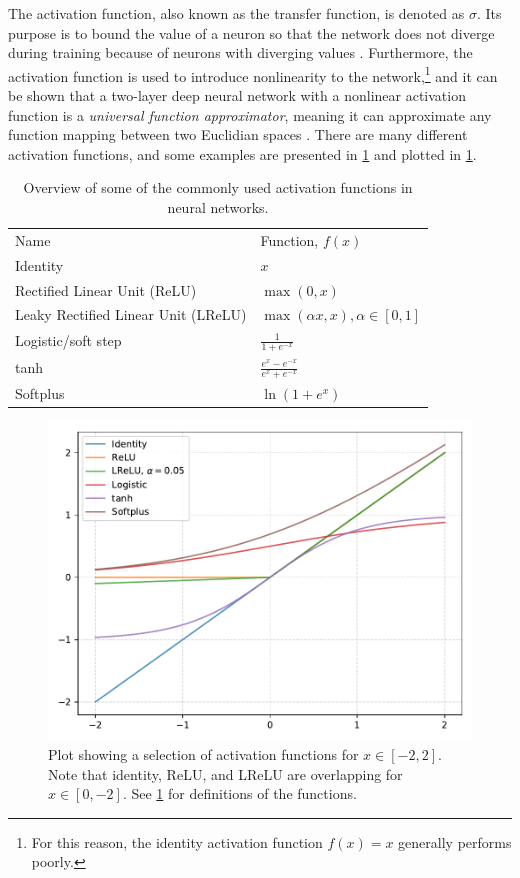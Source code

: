 The activation function, also known as the transfer function, is denoted as $\sigma$. Its purpose is to bound the value of a neuron so that the network does not diverge during training because of neurons with diverging values \cite[81]{Wang2003}. Furthermore, the activation function is used to introduce nonlinearity to the network,\footnote{For this reason, the identity activation function $f(x)=x$ generally performs poorly.} and it can be shown that a two-layer deep neural network with a nonlinear activation function is a \textit{universal function approximator}, meaning it can approximate any function mapping between two Euclidian spaces \cite{Cybenko1989}. There are many different activation functions, and some examples are presented in \cref{tab:activationfunctions} and plotted in \cref{fig:activationfunctions}.

\begin{table}[htbp]
    \centering
    \caption[Activation functions for neural networks]{Overview of some of the commonly used activation functions in neural networks. }
    \label{tab:activationfunctions}
    \begin{tabular}{ll}
    \hline
    Name & Function, $f(x)$ \\
    \hhline{==}
    Identity & $x$ \\
    Rectified Linear Unit (ReLU) & $\max\left(0, x\right)$ \\
    Leaky Rectified Linear Unit (LReLU) & $\max\left(\alpha x, x\right), \alpha\in[0,1]$ \\
    Logistic/soft step & $\frac{1}{1+e^{-x}}$  \\
    tanh & $\frac{e^x - e^{-x}}{e^x + e^{-x}}$ \\
    Softplus & $\ln\left(1+e^x\right)$ \\
    \hline
    \end{tabular}
\end{table}

\begin{figure}[htbp]  
    \centering
    \includegraphics[width=.8\textwidth]{figures/activationfunctions.pdf}
    \caption[Activation functions for neural networks]{Plot showing a selection of activation functions for $x\in[-2,2]$. Note that identity, ReLU, and LReLU are overlapping for $x\in[0,-2]$. See \cref{tab:activationfunctions} for definitions of the functions. }
    \label{fig:activationfunctions}
\end{figure}

